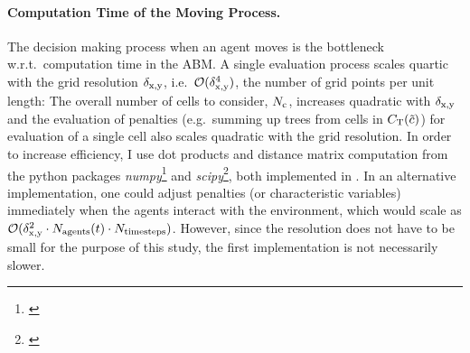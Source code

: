 \paragraph{Computation Time of the Moving Process.}
The decision making process when an agent moves is the bottleneck w.r.t.\ computation time in the ABM.
A single evaluation process scales quartic with the grid resolution $\delta_{\rm x,y}$, i.e.\ $\mathcal{O}(\delta_{\rm x,y}^4)$, the number of grid points per unit length: The overall number of cells to consider, $N_{\rm c}$, increases quadratic with $\delta_{\rm x,y}$ and the evaluation of penalties (e.g.\ summing up trees from cells in $C_{\rm T}(\tilde{c})$) for evaluation of a single cell also scales quadratic with the grid resolution.
In order to increase efficiency, I use dot products and distance matrix computation from the python packages \textit{numpy}\footnote{\citet{numpy}} and \textit{scipy}\footnote{\citet{scipy}}, both implemented in \CC.
In an alternative implementation, one could adjust penalties (or characteristic variables) immediately when the agents interact with the environment, which would scale as $\mathcal{O}(\delta_{\rm x,y}^2\cdot N_{\rm agents}(t)\cdot N_{\rm timesteps})$.
However, since the resolution does not have to be small for the purpose of this study, the first implementation is not necessarily slower.
	
		
		

















